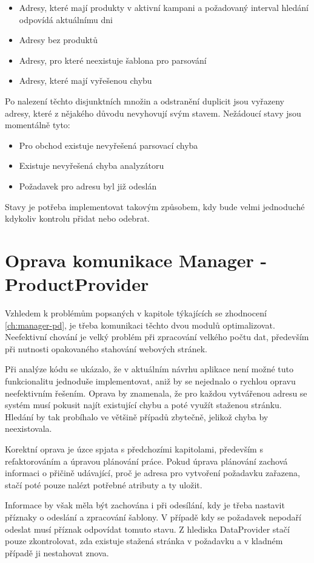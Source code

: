 \documentclass[thesis=B,czech]{FITthesis}[2012/06/26]
\begin{document}
\begin{itemize}
\item Adresy, které mají produkty v aktivní kampani a požadovaný interval hledání odpovídá aktuálnímu dni
\item Adresy bez produktů
\item Adresy, pro které neexistuje šablona pro parsování
\item Adresy, které mají vyřešenou chybu
\end{itemize}

Po nalezení těchto disjunktních množin a odstranění duplicit jsou vyřazeny adresy, které z nějakého důvodu nevyhovují svým stavem.
Nežádoucí stavy jsou momentálně tyto:

\begin{itemize}
\item Pro obchod existuje nevyřešená parsovací chyba
\item Existuje nevyřešená chyba analyzátoru
\item Požadavek pro adresu byl již odeslán
\end{itemize}

Stavy je potřeba implementovat takovým způsobem, kdy bude velmi jednoduché 
kdykoliv kontrolu přidat nebo odebrat.

\section{Oprava komunikace Manager - ProductProvider}
Vzhledem k problémům popsaných v kapitole týkajících se zhodnocení \ref{ch:manager-pd}, je třeba komunikaci těchto dvou modulů optimalizovat. Neefektivní chování je
velký problém při zpracování velkého počtu dat, především při nutnosti opakovaného stahování webových stránek. 
\par
Při analýze kódu se ukázalo, že v aktuálním návrhu aplikace není možné tuto funkcionalitu jednoduše implementovat, aniž by se nejednalo o rychlou opravu neefektivním řešením. Oprava by znamenala, že pro každou vytvářenou adresu se systém musí pokusit najít
existující chybu a poté využít staženou stránku. Hledání by tak probíhalo ve většině případů zbytečně, jelikož chyba by neexistovala.
\par
Korektní oprava je úzce spjata s předchozími kapitolami, především s refaktorováním a úpravou plánování práce. Pokud úprava plánování zachová
informaci o přičině udávající, proč je adresa pro vytvoření požadavku zařazena, stačí poté pouze nalézt potřebné atributy a ty uložit.
\par
Informace by však měla být zachována i při odesílání, kdy je třeba nastavit příznaky o odeslání a zpracování šablony. V případě
kdy se požadavek nepodaří odeslat musí příznak odpovídat tomuto stavu. Z hlediska DataProvider stačí pouze zkontrolovat, zda existuje
stažená stránka v požadavku a v kladném případě ji nestahovat znova.
\end{document}
